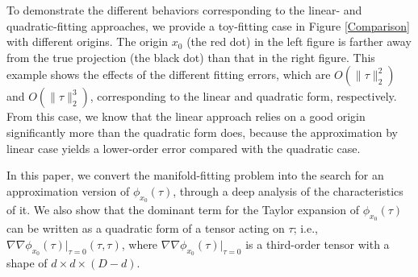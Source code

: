 \documentclass{article}
\theoremstyle{remark}
\begin{document}
To demonstrate the different behaviors corresponding to the linear- and quadratic-fitting approaches, we provide a toy-fitting case in Figure \ref{Comparison} with different origins. The origin $x_0$ (the red dot) in the left figure is farther away from the true projection (the black dot) than that in the right figure.  This example shows the effects of the different fitting errors, which are $O(\|\tau\|_2^2)$ and $O(\|\tau\|_2^3)$, corresponding to the linear and quadratic form, respectively. From this case, we know that the linear approach relies on a good origin significantly more than the quadratic form does, because the approximation by linear case yields a lower-order error compared with the quadratic case.
 
In this paper, we convert the manifold-fitting problem into the search for an approximation version of $\phi_{x_0}(\tau)$, through a deep analysis of the characteristics of it. We also show that the dominant term for the Taylor expansion of $\phi_{x_0}(\tau)$ can be written as a quadratic form of a tensor acting on $\tau$; i.e., $\nabla\nabla \phi_{x_0}(\tau)|_{\tau=0}(\tau,\tau)$, where $\nabla\nabla\phi_{x_0}(\tau)|_{\tau=0}$ is a third-order tensor with a shape of $d\times d\times (D-d)$.  
\end{document}

